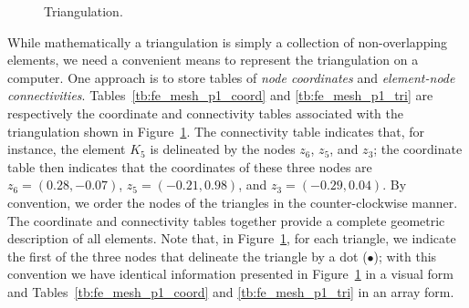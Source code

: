 \begin{figure}
  \centering
  \caption{Triangulation.}
  \label{fig:fe_mesh_p1}
\end{figure}

While mathematically a triangulation is simply a collection of non-overlapping elements, we need a convenient means to represent the triangulation on a computer.  One approach is to store tables of \emph{node coordinates} and \emph{element-node connectivities}.  Tables~\ref{tb:fe_mesh_p1_coord} and \ref{tb:fe_mesh_p1_tri} are respectively the coordinate and connectivity tables associated with the triangulation shown in Figure~\ref{fig:fe_mesh_p1}. The connectivity table indicates that, for instance, the element $K_5$ is delineated by the nodes $z_6$, $z_5$, and $z_3$; the coordinate table then indicates that the coordinates of these three nodes are $z_6 = (0.28,-0.07)$, $z_5 = (-0.21,0.98)$, and $z_3 = (-0.29,0.04)$. By convention, we order the nodes of the triangles in the counter-clockwise manner. The coordinate and connectivity tables together provide a complete geometric description of all elements.  Note that, in Figure~\ref{fig:fe_mesh_p1}, for each triangle, we indicate the first of the three nodes that delineate the triangle by a dot ($\bullet$); with this convention we have identical information presented in Figure~\ref{fig:fe_mesh_p1} in a visual form and Tables~\ref{tb:fe_mesh_p1_coord} and \ref{tb:fe_mesh_p1_tri} in an array form.

